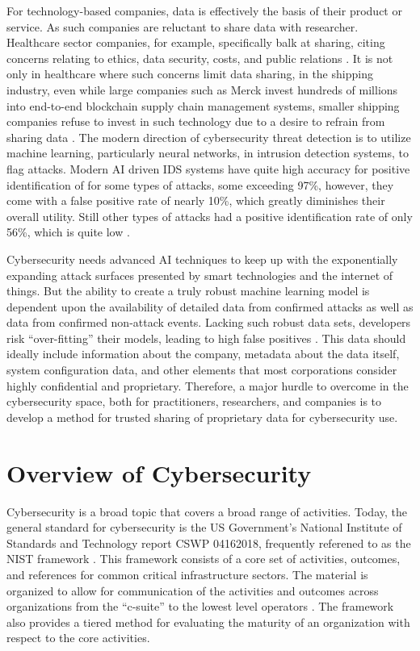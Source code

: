For technology-based companies, data is effectively the basis of their product or service. As such companies are reluctant to share data with researcher. Healthcare sector companies, for example, specifically balk at sharing, citing concerns relating to ethics, data security, costs, and public relations \parencite{pisaniProtectingUserPrivacy2019}. It is not only in healthcare where such concerns limit data sharing, in the shipping industry, even while large companies such as Merck invest hundreds of millions into end-to-end blockchain supply chain management systems, smaller shipping companies refuse to invest in such technology due to a desire to refrain from sharing data \parencite{papathanasiouNonApplicationBlockchain2020}. The modern direction of cybersecurity threat detection is to utilize machine learning, particularly neural networks, in intrusion detection systems, to flag attacks. Modern AI driven IDS systems have quite high accuracy for positive identification of for some types of attacks, some exceeding 97\%, however, they come with a false positive rate of nearly 10\%, which greatly diminishes their overall utility. Still other types of attacks had a positive identification rate of only 56\%, which is quite low \parencite{larriva-novoEvaluationCybersecurityData2020}.

Cybersecurity needs advanced AI techniques to keep up with the exponentially expanding attack surfaces presented by smart technologies and the internet of things. But the ability to create a truly robust machine learning model is dependent upon the availability of detailed data from confirmed attacks as well as data from confirmed non-attack events. Lacking such robust data sets, developers risk ``over-fitting'' their models, leading to high false positives \parencite{sarkerCybersecurityDataScience2020,larriva-novoEvaluationCybersecurityData2020}. This data should ideally include information about the company, metadata about the data itself, system configuration data, and other elements that most corporations consider highly confidential and proprietary. Therefore, a major hurdle to overcome in the cybersecurity space, both for practitioners, researchers, and companies is to develop a method for trusted sharing of proprietary data for cybersecurity use.

\section{Overview of Cybersecurity}

Cybersecurity is a broad topic that covers a broad range of activities. Today, the general standard for cybersecurity is the US Government's National Institute of Standards and Technology report CSWP 04162018, frequently referened to as the NIST framework \parencite{shackelfordBusinessCyberPeace2016}. This framework consists of a core set of activities, outcomes, and references for common critical infrastructure sectors. The material is organized to allow for communication of the activities and outcomes across organizations from the ``c-suite'' to the lowest level operators \parencite{nistFrameworkImprovingCritical2018}. The framework also provides a tiered method for evaluating the maturity of an organization with respect to the core activities.

